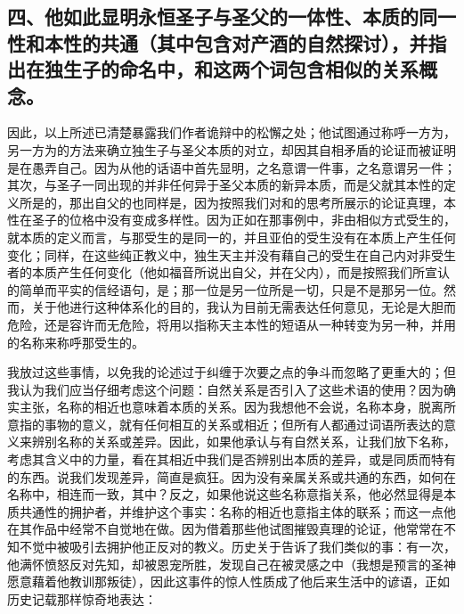 
\subsection{四、他如此显明永恒圣子与圣父的一体性、本质的同一性和本性的共通（其中包含对产酒的自然探讨），并指出在独生子的命名中，和这两个词包含相似的关系概念。}

因此，以上所述已清楚暴露我们作者诡辩中的松懈之处；他试图通过称呼一方为，另一方为的方法来确立独生子与圣父本质的对立，却因其自相矛盾的论证而被证明是在愚弄自己。因为从他的话语中首先显明，之名意谓一件事，之名意谓另一件；其次，与圣子一同出现的并非任何异于圣父本质的新异本质，而是父就其本性的定义所是的，那出自父的也同样是，因为按照我们对和的思考所展示的论证真理，本性在圣子的位格中没有变成多样性。因为正如在那事例中，非由相似方式受生的，就本质的定义而言，与那受生的是同一的，并且亚伯的受生没有在本质上产生任何变化；同样，在这些纯正教义中，独生天主并没有藉自己的受生在自己内对非受生者的本质产生任何变化（他如福音所说出自父，并在父内），而是按照我们所宣认的简单而平实的信经语句，是；那一位是另一位所是一切，只是不是那另一位。然而，关于他进行这种体系化的目的，我认为目前无需表达任何意见，无论是大胆而危险，还是容许而无危险，将用以指称天主本性的短语从一种转变为另一种，并用的名称来称呼那受生的。\par

我放过这些事情，以免我的论述过于纠缠于次要之点的争斗而忽略了更重大的；但我认为我们应当仔细考虑这个问题：自然关系是否引入了这些术语的使用？因为确实主张，名称的相近也意味着本质的关系。因为我想他不会说，名称本身，脱离所意指的事物的意义，就有任何相互的关系或相近；但所有人都通过词语所表达的意义来辨别名称的关系或差异。因此，如果他承认与有自然关系，让我们放下名称，考虑其含义中的力量，看在其相近中我们是否辨别出本质的差异，或是同质而特有的东西。说我们发现差异，简直是疯狂。因为没有亲属关系或共通的东西，如何在名称中，相连而一致，其中？反之，如果他说这些名称意指关系，他必然显得是本质共通性的拥护者，并维护这个事实：名称的相近也意指主体的联系；而这一点他在其作品中经常不自觉地在做。因为借着那些他试图摧毁真理的论证，他常常在不知不觉中被吸引去拥护他正反对的教义。历史关于告诉了我们类似的事：有一次，他满怀愤怒反对先知，却被恩宠所胜，发现自己在被灵感之中（我想是预言的圣神愿意藉着他教训那叛徒），因此这事件的惊人性质成了他后来生活中的谚语，正如历史记载那样惊奇地表达：\par

